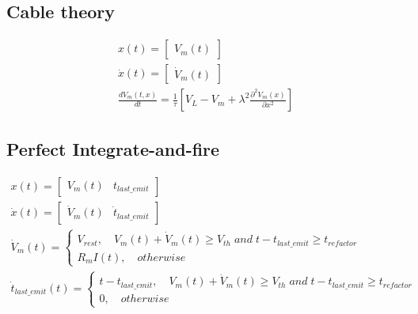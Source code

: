 \subsection{Cable theory}
\begin{align}
    x(t) = \begin{bmatrix} V_m(t)\end{bmatrix} \label{eq:smm-ct-1} \\
    \dot x(t) = \begin{bmatrix} \dot V_m(t) \end{bmatrix} \label{eq:smm-ct-2} \\
    \frac{dV_m(t,x)}{dt} = \frac{1}{\tau}[V_L - V_m + \lambda^2\frac{\partial^2 V_m(x)}{\partial x^2}] \label{eq:smm-ct-3} 
\end{align}


\subsection{Perfect Integrate-and-fire}
\begin{align}
    x(t) = \begin{bmatrix}V_m(t) & t_{last\_emit}\end{bmatrix} \label{eq:smm-perfect-lif-1} \\
    \dot x(t) = \begin{bmatrix}\dot V_m(t) & \dot t_{last\_emit}\end{bmatrix} \label{eq:smm-perfect-lif-2} \\
    \dot V_m(t) = \begin{cases}
        V_{rest}, \quad V_m(t) + \dot V_m(t) \ge V_{th}\;and\;t-t_{last\_emit}\ge t_{refactor}  \\
        R_mI(t),\quad otherwise
    \end{cases} \label{eq:smm-lif-3}\\
    \dot t_{last\_emit}(t) = \begin{cases}
        t-t_{last\_emit}, \quad V_m(t) + \dot V_m(t) \ge V_{th}\;and\;t-t_{last\_emit}\ge t_{refactor} \\
        0,\quad otherwise
    \end{cases} \label{eq:smm-lif-3}
\end{align}


